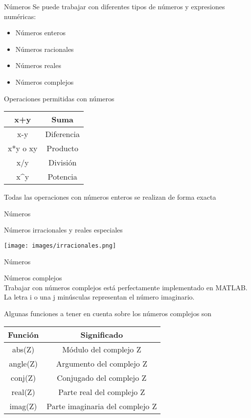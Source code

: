 \documentclass{bredelebeamer}
\begin{document}
\begin{frame}{Números}
Se puede trabajar con diferentes tipos de números y expresiones numéricas:
\begin{itemize}
\item Números enteros
\item Números racionales
\item Números reales
\item Números complejos
\end{itemize}
Operaciones permitidas con números
\begin{table}[]
\centering
\begin{tabular}{|c|c|}
\hline
x+y                  & Suma       \\ \hline
x-y                  & Diferencia \\ \hline
x*y o xy             & Producto   \\ \hline
x/y                  & División   \\ \hline
x\textasciicircum{}y & Potencia   \\ \hline
\end{tabular}
\end{table}
\begin{center}
Todas las operaciones con números enteros se realizan de forma exacta
\end{center}
\end{frame}

\begin{frame}{Números}
\begin{center}
Números irracionales y reales especiales
\end{center}
\begin{center}
\texttt{[image: images/irracionales.png]}
\end{center}
\end{frame}

\begin{frame}{Números}
\begin{center}
Números complejos\\
Trabajar con números complejos está perfectamente implementado en MATLAB. La letra i o una j minúsculas representan el número imaginario.
\end{center}
Algunas funciones a tener en cuenta sobre los números complejos son
\begin{table}[]
\centering
\begin{tabular}{|c|c|}
\hline
Función  & Significado                     \\ \hline
abs(Z)   & Módulo del complejo Z          \\ \hline
angle(Z) & Argumento del complejo Z        \\ \hline
conj(Z)  & Conjugado del complejo Z        \\ \hline
real(Z)  & Parte real del complejo Z       \\ \hline
imag(Z)  & Parte imaginaria del complejo Z \\ \hline
\end{tabular}
\end{table}
\end{frame}
\end{document}

